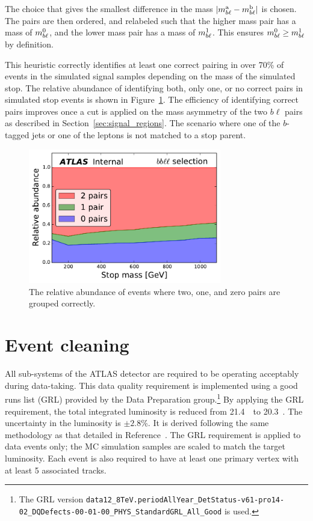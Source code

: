 The choice that gives the
smallest difference in the mass $|m_{b\ell}^\mathrm{a} - m_{b\ell}^\mathrm{b}|$
is chosen.
The pairs are then ordered, and relabeled such that the higher mass pair has a
mass of $m_{b\ell}^{0}$, and the lower mass pair has a mass of $m_{b\ell}^{1}$.
This ensures $m_{b\ell}^{0} \geq m_{b\ell}^{1}$ by definition.

This heuristic correctly identifies at least one correct pairing in over
70\% of events in the simulated signal samples
depending on the mass of the simulated stop. The relative abundance of
identifying both, only one, or no correct pairs in simulated stop events is
shown in Figure~\ref{fig:pairing_eff}.
The efficiency of identifying correct pairs improves once a cut is applied on
the mass asymmetry of the two $b\ell$ pairs as described in
Section~\ref{sec:signal_regions}.
The scenario where one of the $b$-tagged jets or one of the leptons is not
matched to a stop parent.

\begin{figure}[ht]
  \centering
  \includegraphics[width=0.75\textwidth]
    {figs/blstop/PairingEfficiencies/pairing_abundance__inclusive.pdf}
  \caption{The relative abundance of events where two, one, and zero
    pairs are grouped correctly.
  }
  \label{fig:pairing_eff}
\end{figure}

\FloatBarrier
\section{Event cleaning}
\label{sec:event_cleaning}

All sub-systems of the ATLAS detector are required to be operating acceptably
during data-taking. 
This data quality requirement is implemented using a good runs list (GRL)
provided by the Data Preparation group.\footnote{The GRL version
\texttt{data12\_8TeV.periodAllYear\_DetStatus-v61-pro14-02\_DQDefects-00-01-00\_PHYS\_StandardGRL\_All\_Good}
is used.}
By applying the GRL requirement, the total integrated luminosity is reduced
from 21.4~\ifb\ to 20.3~\ifb.
The uncertainty in the luminosity is $\pm 2.8$\%.
It is derived following the same methodology as that detailed
in Reference~\cite{Lumi}.
The GRL requirement is applied to data events only; the MC simulation samples
are scaled to match the target luminosity.
Each event is also required to have at least one primary vertex with at least
5 associated tracks.


